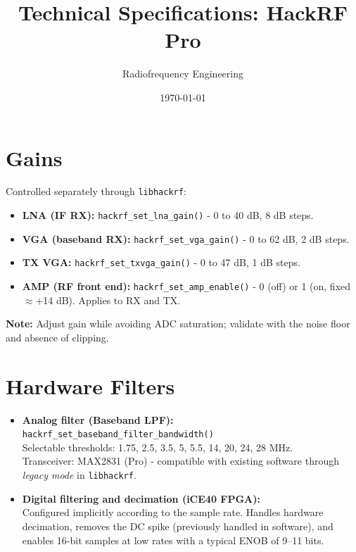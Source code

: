 \documentclass[11pt]{article}
\title{Technical Specifications: HackRF Pro}
\author{Radiofrequency Engineering}
\date{\today}
\begin{document}
\maketitle
\tableofcontents
\newpage

\section{Gains}

Controlled separately through \texttt{libhackrf}:

\begin{itemize}
    \item \textbf{LNA (IF RX):} \texttt{hackrf\_set\_lna\_gain()} - 0 to 40 dB, 8 dB steps.
    \item \textbf{VGA (baseband RX):} \texttt{hackrf\_set\_vga\_gain()} - 0 to 62 dB, 2 dB steps.
    \item \textbf{TX VGA:} \texttt{hackrf\_set\_txvga\_gain()} - 0 to 47 dB, 1 dB steps.
    \item \textbf{AMP (RF front end):} \texttt{hackrf\_set\_amp\_enable()} - 0 (off) or 1 (on, fixed $\approx$+14 dB). Applies to RX and TX.
\end{itemize}

\textbf{Note:} Adjust gain while avoiding ADC saturation; validate with the noise floor and absence of clipping.

\section{Hardware Filters}

\begin{itemize}
    \item \textbf{Analog filter (Baseband LPF):} \texttt{hackrf\_set\_baseband\_filter\_bandwidth()}\\
    Selectable thresholds: 1.75, 2.5, 3.5, 5, 5.5, 14, 20, 24, 28 MHz.\\
    Transceiver: MAX2831 (Pro) - compatible with existing software through \textit{legacy mode} in \texttt{libhackrf}.

    \item \textbf{Digital filtering and decimation (iCE40 FPGA):}\\
    Configured implicitly according to the sample rate. Handles hardware decimation, removes the DC spike (previously handled in software), and enables 16-bit samples at low rates with a typical ENOB of 9--11 bits.
\end{itemize}
\end{document}
